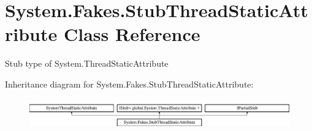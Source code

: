 \hypertarget{class_system_1_1_fakes_1_1_stub_thread_static_attribute}{\section{System.\-Fakes.\-Stub\-Thread\-Static\-Attribute Class Reference}
\label{class_system_1_1_fakes_1_1_stub_thread_static_attribute}
}


Stub type of System.\-Thread\-Static\-Attribute 


Inheritance diagram for System.\-Fakes.\-Stub\-Thread\-Static\-Attribute\-:\begin{figure}[H]
\begin{center}
\leavevmode
\includegraphics[height=1.372549cm]{class_system_1_1_fakes_1_1_stub_thread_static_attribute}
\end{center}
\end{figure}
